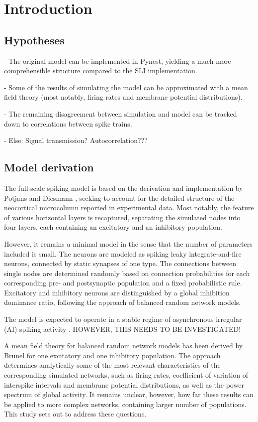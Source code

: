 \section{Introduction}
\label{sec:intro}
\subsection{Hypotheses}
- The original model can be implemented in Pynest, yielding a much more 
comprehensible structure compared to the SLI implementation. 

- Some of the results of simulating the model can be approximated with a 
mean field theory (most notably, firing rates and membrane potential
distributions).

- The remaining disagreement between simulation and model can be tracked 
down to correlations between spike trains.

- Else: Signal transmission? Autocorrelation???

\subsection{Model derivation}
The full-scale spiking model is based on the derivation and implementation 
by Potjans and Diesmann \cite{potjans2014}, seeking to account for the detailed 
structure of the neocortical microcolumn reported in experimental data. 
Most notably, the feature of various horizontal layers is recaptured, 
separating the simulated nodes into four layers, each containing an 
excitatory and an inhibitory population. 

However, it remains a minimal model in the sense that the number of 
parameters included is small. The neurons are modeled as spiking leaky 
integrate-and-fire neurons, connected by static synapses of one type. 
The connections between single nodes are determined randomly based on 
connection probabilities for each corresponding pre- and postsynaptic 
population and a fixed probabilistic rule. Excitatory and inhibitory 
neurons are distinguished by a global inhibition dominance ratio, following
the approach of balanced random network models.

The model is expected to operate in a stable regime of asynchronous irregular 
(AI) spiking activity \cite{brunel2000}. HOWEVER, THIS NEEDS TO BE INVESTIGATED!

A mean field theory for balanced random network models has been derived by 
Brunel \cite{brunel2000} for one excitatory and one inhibitory population. 
The approach determines analytically some of the most relevant characteristics
of the corresponding simulated networks, such as firing rates, coefficient 
of variation of interspike intervals and membrane potential distributions, 
as well as the power spectrum of global activity. It remains unclear, however, 
how far these results can be applied to more complex networks, containing 
larger number of populations. This study sets out to address these questions. 

